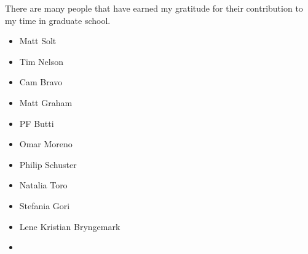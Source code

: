 
There are many people that have earned my gratitude for their contribution to my time in graduate
school.

\begin{itemize}
  \item Matt Solt
  \item Tim Nelson
  \item Cam Bravo
  \item Matt Graham
  \item PF Butti
  \item Omar Moreno
  \item Philip Schuster
  \item Natalia Toro
  \item Stefania Gori
  \item Lene Kristian Bryngemark \item
\end{itemize}

